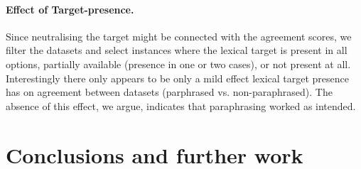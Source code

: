 \documentclass[11pt]{article}
\begin{document}
\paragraph{Effect of Target-presence.} Since neutralising the target might be connected with the agreement scores, we  filter the datasets and select instances where the lexical target is present in all options, partially available (presence in one or two cases), or not present at all. Interestingly there only appears to be only a mild effect lexical target presence has on agreement between datasets (parphrased vs. non-paraphrased). The absence of this effect, we argue, indicates that paraphrasing worked as intended. 



\section{Conclusions and further work}
\end{document}
